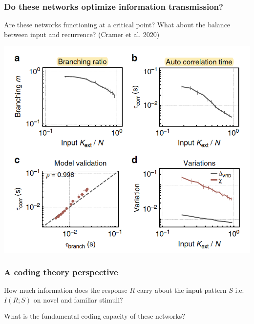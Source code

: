 \documentclass{beamer}
\begin{document}
\begin{frame}[plain]
\frametitle{Do these networks optimize information transmission?} 

Are these networks functioning at a critical point? What about the balance between input and recurrence? (Cramer et al. 2020)

\begin{center}
\includegraphics[scale=0.55]{cramer-criticality}
\end{center}

\end{frame}


\begin{frame}[plain]
\frametitle{A coding theory perspective} 

How much information does the response $R$ carry about the input pattern $S$ i.e. $I(R;S)$ on novel and familiar stimuli?

\vspace{0.2in}

What is the fundamental coding capacity of these networks?

\end{frame}


\begin{thebibliography}{99} 
\end{thebibliography}
\end{document}
